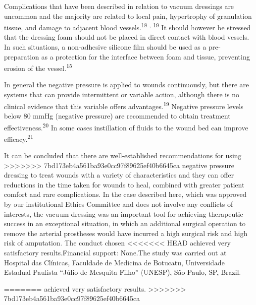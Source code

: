 \documentclass[numberinsection,times,10pt,spreadimages]{memoir}
\begin{document}
Complications that have been described in relation to vacuum dressings are
uncommon and the majority are related to local pain, hypertrophy of granulation
tissue, and damage to adjacent blood vessels.\textsuperscript{18}
\textsuperscript{,}
\textsuperscript{19}
It should however be stressed that the dressing
foam should not be placed in direct contact with blood vessels. In such
situations, a non-adhesive silicone film should be used as a pre-preparation as
a protection for the interface between foam and tissue, preventing erosion of
the vessel.\textsuperscript{15}

In general the negative pressure is applied to wounds continuously, but there
are
systems that can provide intermittent or variable action, although there is no
clinical evidence that this variable offers advantages.\textsuperscript{19}
Negative pressure levels below 80 mmHg
(negative pressure) are recommended to obtain treatment
effectiveness.\textsuperscript{20}
In some cases instillation
of fluids to the wound bed can improve efficacy.\textsuperscript{21}

It can be concluded that there are well-established recommendations for using
>>>>>>> 7bd173eb4a561ba93e0cc97f89625ef40b6645ca
negative pressure dressing to treat wounds with a variety of characteristics and
they can offer reductions in the time taken for wounds to heal, combined with
greater patient comfort and rare complications. In the case described here,
which was approved by our institutional Ethics Committee and does not involve
any conflicts of interests, the vacuum dressing was an important tool for
achieving therapeutic success in an exceptional situation, in which an
additional surgical operation to remove the arterial prostheses would have
incurred a high surgical risk and high risk of amputation. The conduct chosen
<<<<<<< HEAD
achieved very satisfactory results.Financial support: None.The study was carried
out at Hospital das Clínicas, Faculdade de Medicina de
Botucatu, Universidade Estadual Paulista “Júlio de Mesquita Filho” (UNESP),
São Paulo, SP, Brazil.

% 
=======
achieved very satisfactory results.
>>>>>>> 7bd173eb4a561ba93e0cc97f89625ef40b6645ca
\end{document}
